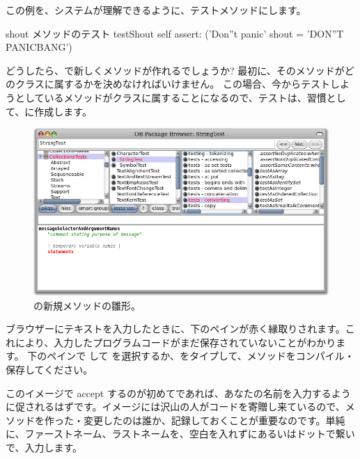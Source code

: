 \documentclass[a4paper,10pt,twoside]{book}
\begin{document}
\noindent
この例を、システムが理解できるように、テストメソッドにします。

\begin{method}[testShout]{shout メソッドのテスト}
testShout
	self assert: ('Don''t panic' shout = 'DON''T PANICBANG')
\end{method} %

どうしたら、\pharo で新しくメソッドが作れるでしょうか? 最初に、そのメソッドがどのクラスに属するかを決めなければいけません。
この場合、今からテストしようとしているメソッドがクラスに属することになるので、テストは、習慣として、に作成します。

\begin{figure}[hbt]
\centerline {\includegraphics[width=\textwidth]{StringTest-newMethodTemplate}}
\caption{の新規メソッドの雛形。
}
\end{figure}

ブラウザーにテキストを入力したときに、下のペインが赤く縁取りされます。これにより、入力したプログラムコードがまだ保存されていないことがわかります。
下のペインで \actclick して を選択するか、をタイプして、メソッドをコンパイル・保存してください。

このイメージで accept するのが初めてであれば、あなたの名前を入力するように促されるはずです。イメージには沢山の人がコードを寄贈し来ているので、メソッドを作った・変更したのは誰か、記録しておくことが重要なのです。単純に、ファーストネーム、ラストネームを、空白を入れずにあるいはドットで繋いで、入力します。
\end{document}
